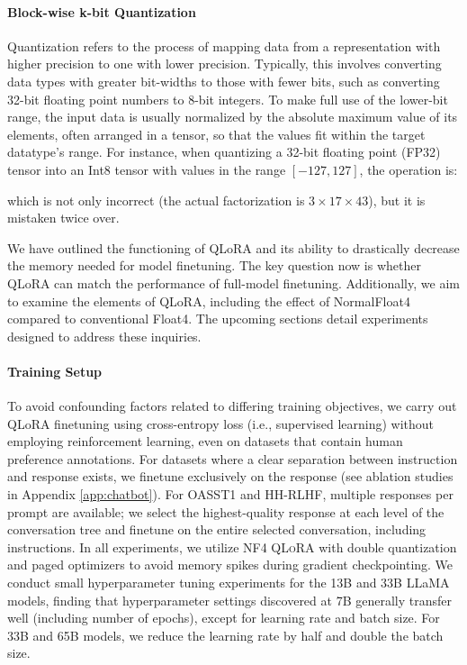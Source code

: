 \paragraph{Block-wise k-bit Quantization} Quantization refers to the process of mapping data from a representation with higher precision to one with lower precision. Typically, this involves converting data types with greater bit-widths to those with fewer bits, such as converting 32-bit floating point numbers to 8-bit integers. To make full use of the lower-bit range, the input data is usually normalized by the absolute maximum value of its elements, often arranged in a tensor, so that the values fit within the target datatype's range. For instance, when quantizing a 32-bit floating point (FP32) tensor into an Int8 tensor with values in the range $[-127, 127]$, the operation is:

which is not only incorrect (the actual factorization is $3 \times 17 \times 43$), but it is mistaken twice over.

We have outlined the functioning of QLoRA and its ability to drastically decrease the memory needed for model finetuning. The key question now is whether QLoRA can match the performance of full-model finetuning. Additionally, we aim to examine the elements of QLoRA, including the effect of NormalFloat4 compared to conventional Float4. The upcoming sections detail experiments designed to address these inquiries.

\paragraph{Training Setup} To avoid confounding factors related to differing training objectives, we carry out QLoRA finetuning using cross-entropy loss (i.e., supervised learning) without employing reinforcement learning, even on datasets that contain human preference annotations. For datasets where a clear separation between instruction and response exists, we finetune exclusively on the response (see ablation studies in Appendix \ref{app:chatbot}). For OASST1 and HH-RLHF, multiple responses per prompt are available; we select the highest-quality response at each level of the conversation tree and finetune on the entire selected conversation, including instructions. In all experiments, we utilize NF4 \textsc{QLoRA} with double quantization and paged optimizers to avoid memory spikes during gradient checkpointing. We conduct small hyperparameter tuning experiments for the 13B and 33B LLaMA models, finding that hyperparameter settings discovered at 7B generally transfer well (including number of epochs), except for learning rate and batch size. For 33B and 65B models, we reduce the learning rate by half and double the batch size.

